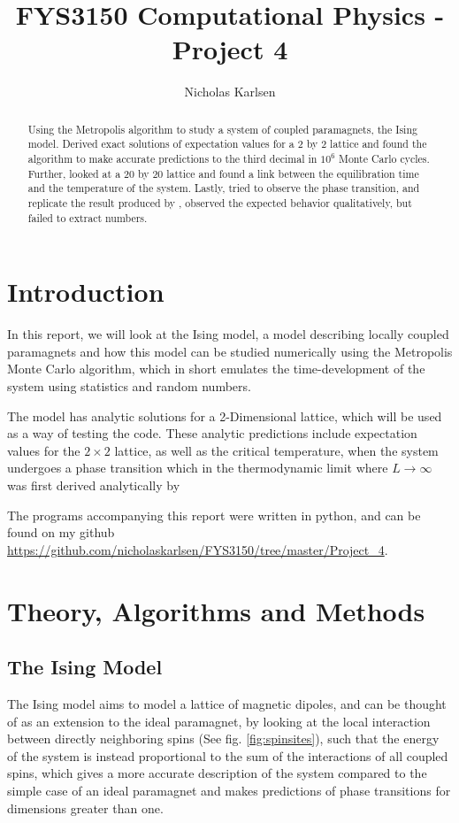 \documentclass[10pt,showpacs,preprintnumbers,amsmath,amssymb,nofootinbib,aps,prl,twocolumn,groupedaddress,superscriptaddress,showkeys]{revtex4-1}
\begin{document}
\title{FYS3150 Computational Physics - Project 4}
\author{Nicholas Karlsen}


\begin{abstract}
  Using the Metropolis algorithm to study a system of coupled paramagnets, the Ising model. Derived exact solutions of expectation values for a 2 by 2 lattice and found the algorithm to make accurate predictions to the third decimal in $10^6$ Monte Carlo cycles. Further, looked at a 20 by 20 lattice and found a link between the equilibration time and the temperature of the system. Lastly, tried to observe the phase transition, and replicate the result produced by \textcite{PhysRev.65.117}, observed the expected behavior qualitatively, but failed to extract numbers.
\end{abstract}

\maketitle


\section{Introduction}

In this report, we will look at the Ising model, a model describing locally coupled paramagnets and how this model can be studied numerically using the Metropolis Monte Carlo algorithm, which in short emulates the time-development of the system using statistics and random numbers. 

The model has analytic solutions for a 2-Dimensional lattice, which will be used as a way of testing the code. These analytic predictions include expectation values for the $2\times2$ lattice, as well as the critical temperature, when the system undergoes a phase transition which in the thermodynamic limit where $L\rightarrow \infty$ was first derived analytically by \textcite{PhysRev.65.117}

The programs accompanying this report were written in python, and can be found on my github \url{https://github.com/nicholaskarlsen/FYS3150/tree/master/Project_4}.

\section{Theory, Algorithms and Methods}
  \subsection{The Ising Model}
    The Ising model aims to model a lattice of magnetic dipoles, and can be thought of as an extension to the ideal paramagnet, by looking at the local interaction between directly neighboring spins (See fig. \ref{fig:spinsites}), such that the energy of the system is instead proportional to the sum of the interactions of all coupled spins, which gives a more accurate description of the system compared to the simple case of an ideal paramagnet and makes predictions of phase transitions for dimensions greater than one.
\end{document}
